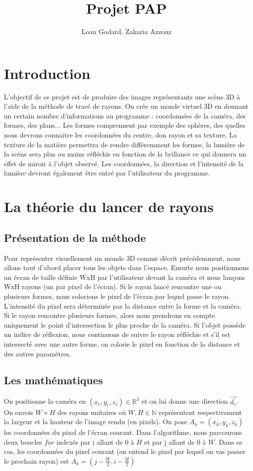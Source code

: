 \documentclass[11pt, oneside]{article}   	%
\title{Projet PAP}
\author{Loan Godard, Zakaria Azzouz}
\begin{document}
\maketitle
\section{Introduction}

L'objectif de ce projet est de produire des images représentants une scène 3D à l'aide de la méthode de tracé de rayons. On crée un monde virtuel 3D en donnant un certain nombre d'informations au programme : coordonnées de la caméra, des formes, des plans... Les formes comprennent par exemple des sphères, des quelles nous devrons connaitre les coordonnées du centre, don rayon et sa texture. La texture de la matière permettra de rendre différemment les formes, la lumière de la scène sera plus ou moins réfléchis en fonction de la brillance ce qui donnera un effet de miroir à l'objet observé. Les coordonnées, la direction et l'intensité de la lumière devront également être entré par l'utilisateur du programme.

\section{La théorie du lancer de rayons}
\subsection{Présentation de la méthode}
Pour représenter visuellement un monde 3D comme décrit précédemment, nous allons tout d'abord placer tous les objets dans l'espace. Ensuite nous positionnons un écran de taille définie WxH par l'utilisateur devant la caméra et nous lan\c cons WxH rayons (un par pixel de l'écran). Si le rayon lancé rencontre une ou plusieurs formes, nous colorions le pixel de l'écran par lequel passe le rayon. L'intensité du pixel sera déterminée par la distance entre la forme et la caméra. Si le rayon rencontre plusieurs formes, alors nous prendrons en compte uniquement le point d'intersection le plus proche de la caméra. Si l'objet possède un indice de réflexion, nous continuons de suivre le rayon réfléchie et s'il est intersecté avec une autre forme, on colorie le pixel en fonction de la distance et des autres paramètres.

\subsection{Les mathématiques}
On positionne la caméra en $(x_{c},y_{c},z_{c}) \in \mathbb{R}^{3}$ et on lui donne une direction $\vec{d_{c}}$. On envois $W\times H$ des rayons unitaires où $W,H \in \mathbb{N}$ représentent respectivement la largeur et la hauteur de l'image rendu (en pixels). On pose $A_{k}=(x_{k},y_{k},z_{k})$ les coordonnées du pixel de l'écran courant. Dans l'algorithme, nous parcourons deux boucles $\mathit{for}$ indexés par i allant de $0$ à $H$ et par j allant de $0$ à $W$. Dans ce cas, les coordonnées du pixel courant (on entend le pixel par lequel on vas passer le prochain rayon) est $A_{k} = (j-\frac{W}{2},i-\frac{H}{2})$
\end{document}
